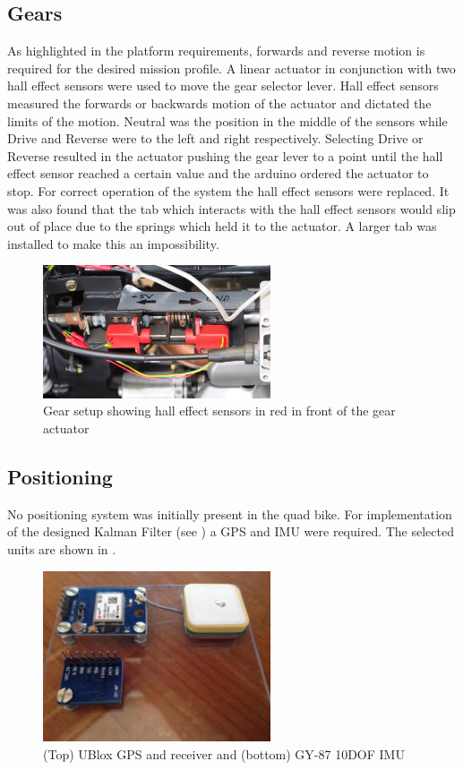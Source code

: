 \documentclass[main.tex]{subfiles}
\begin{document}
\subsection{Gears}
As highlighted in the platform requirements, forwards and reverse motion is required for the desired mission profile. A linear actuator in conjunction with two hall effect sensors were used to move the gear selector lever. Hall effect sensors measured the forwards or backwards motion of the actuator and dictated the limits of the motion. Neutral was the position in the middle of the sensors while Drive and Reverse were to the left and right respectively. Selecting Drive or Reverse resulted in the actuator pushing the gear lever to a point until the hall effect sensor reached a certain value and the arduino ordered the actuator to stop. For correct operation of the system the hall effect sensors were replaced. It was also found that the tab which interacts with the hall effect sensors would slip out of place due to the springs which held it to the actuator. A larger tab was installed to make this an impossibility.
\begin{figure}[ht]
\includegraphics[width=0.6\textwidth]{4-DetailedDesign/gearSetup.JPG}
\centering
\caption{Gear setup showing hall effect sensors in red in front of the gear actuator} 
\end{figure}

\subsection{Positioning}
No positioning system was initially present in the quad bike. For implementation of the designed Kalman Filter (see ) a GPS and IMU were required. The selected units are shown in .

\begin{figure}[ht]
\includegraphics[width=0.6\textwidth]{4-DetailedDesign/Positioning.jpg}
\centering
\caption{(Top) UBlox GPS and receiver and (bottom) GY-87 10DOF IMU} 
\end{figure}
\end{document}
